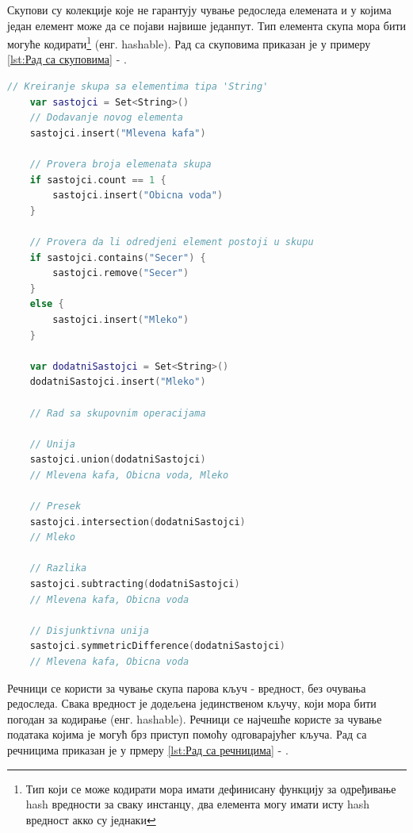 \documentclass[12pt,oneside]{memoir}
\begin{document}
\indent Скупови су колекције које не гарантују чување редоследа елемената и у којима један елемент може да се појави највише једанпут. Тип елемента скупа мора бити могуће кодирати\footnote{Тип који се може кодирати мора имати дефинисану функцију за одређивање hash вредности за сваку инстанцу, два елемента могу имати исту hash вредност акко су једнаки} (енг. hashable). Рад са скуповима приказан је у примеру \ref{lst:Рад са скуповима} - .

\begin{lstlisting}[caption=\textit{{Рад са скуповима}}, label={lst:Рад са скуповима}, language=Swift, frame=single]
    // Kreiranje skupa sa elementima tipa 'String'
    var sastojci = Set<String>()
    // Dodavanje novog elementa
    sastojci.insert("Mlevena kafa")
    
    // Provera broja elemenata skupa
    if sastojci.count == 1 {
        sastojci.insert("Obicna voda")
    }
    
    // Provera da li odredjeni element postoji u skupu
    if sastojci.contains("Secer") {
        sastojci.remove("Secer")
    }
    else {
        sastojci.insert("Mleko")
    }
    
    var dodatniSastojci = Set<String>()
    dodatniSastojci.insert("Mleko")
    
    // Rad sa skupovnim operacijama
    
    // Unija
    sastojci.union(dodatniSastojci)
    // Mlevena kafa, Obicna voda, Mleko
    
    // Presek
    sastojci.intersection(dodatniSastojci)
    // Mleko
    
    // Razlika
    sastojci.subtracting(dodatniSastojci)
    // Mlevena kafa, Obicna voda
    
    // Disjunktivna unija
    sastojci.symmetricDifference(dodatniSastojci)
    // Mlevena kafa, Obicna voda
\end{lstlisting}

\indent Речници се користи за чување скупа парова кључ - вредност, без очувања редоследа. Свака вредност је додељена јединственом кључу, који мора бити погодан за кодирање (енг. hashable). Речници се најчешће користе за чување података којима је могућ брз приступ помоћу одговарајућег кључа. Рад са речницима приказан је у прмеру \ref{lst:Рад са речницима} - .
\end{document}
